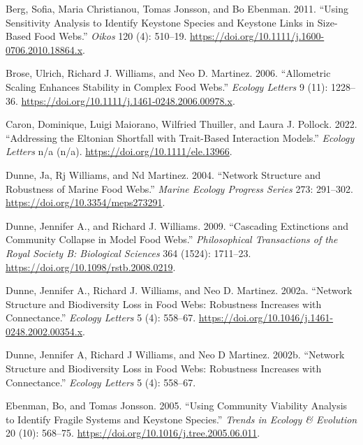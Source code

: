 \documentclass{article}
\newlength{\cslhangindent}
\newlength{\cslentryspacingunit} %
\newenvironment{CSLReferences}[2] %
 {%
  \setlength{\parindent}{0pt}
  \ifodd #1
  \let\oldpar\par
  \def\par{\hangindent=\cslhangindent\oldpar}
  \fi
  \setlength{\parskip}{#2\cslentryspacingunit}
 }%
 {}
\begin{document}
\hypertarget{refs}{}
\begin{CSLReferences}{1}{0}
\leavevmode{}%
Berg, Sofia, Maria Christianou, Tomas Jonsson, and Bo Ebenman. 2011.
{``Using Sensitivity Analysis to Identify Keystone Species and Keystone
Links in Size-Based Food Webs.''} \emph{Oikos} 120 (4): 510--19.
\url{https://doi.org/10.1111/j.1600-0706.2010.18864.x}.

\leavevmode{}%
Brose, Ulrich, Richard J. Williams, and Neo D. Martinez. 2006.
{``Allometric Scaling Enhances Stability in Complex Food Webs.''}
\emph{Ecology Letters} 9 (11): 1228--36.
\url{https://doi.org/10.1111/j.1461-0248.2006.00978.x}.

\leavevmode{}%
Caron, Dominique, Luigi Maiorano, Wilfried Thuiller, and Laura J.
Pollock. 2022. {``Addressing the {Eltonian} Shortfall with Trait-Based
Interaction Models.''} \emph{Ecology Letters} n/a (n/a).
\url{https://doi.org/10.1111/ele.13966}.

\leavevmode{}%
Dunne, Ja, Rj Williams, and Nd Martinez. 2004. {``Network Structure and
Robustness of Marine Food Webs.''} \emph{Marine Ecology Progress Series}
273: 291--302. \url{https://doi.org/10.3354/meps273291}.

\leavevmode{}%
Dunne, Jennifer A., and Richard J. Williams. 2009. {``Cascading
Extinctions and Community Collapse in Model Food Webs.''}
\emph{Philosophical Transactions of the Royal Society B: Biological
Sciences} 364 (1524): 1711--23.
\url{https://doi.org/10.1098/rstb.2008.0219}.

\leavevmode{}%
Dunne, Jennifer A., Richard J. Williams, and Neo D. Martinez. 2002a.
{``Network Structure and Biodiversity Loss in Food Webs: Robustness
Increases with Connectance.''} \emph{Ecology Letters} 5 (4): 558--67.
\url{https://doi.org/10.1046/j.1461-0248.2002.00354.x}.

\leavevmode{}%
Dunne, Jennifer A, Richard J Williams, and Neo D Martinez. 2002b.
{``Network Structure and Biodiversity Loss in Food Webs: Robustness
Increases with Connectance.''} \emph{Ecology Letters} 5 (4): 558--67.

\leavevmode{}%
Ebenman, Bo, and Tomas Jonsson. 2005. {``Using Community Viability
Analysis to Identify Fragile Systems and Keystone Species.''}
\emph{Trends in Ecology \& Evolution} 20 (10): 568--75.
\url{https://doi.org/10.1016/j.tree.2005.06.011}.


\end{CSLReferences}
\end{document}
